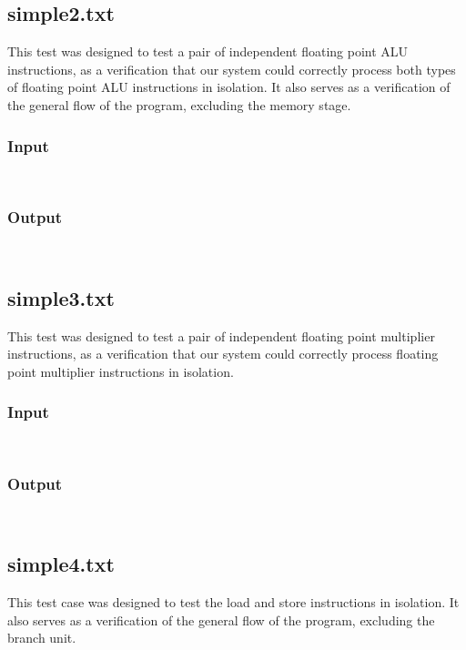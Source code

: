 \documentclass[12pt]{article}
\begin{document}
\subsection{simple2.txt}
This test was designed to test a pair of independent floating point ALU instructions, as a verification that our system could correctly process both types of floating point ALU instructions in isolation.  It also serves as a verification of the general flow of the program, excluding the memory stage.

\subsubsection*{Input}
\begin{verbatim}
    
\end{verbatim}

\subsubsection*{Output}
\begin{verbatim}
    
\end{verbatim}


\subsection{simple3.txt}
This test was designed to test a pair of independent floating point multiplier instructions, as a verification that our system could correctly process floating point multiplier instructions in isolation.

\subsubsection*{Input}
\begin{verbatim}
    
\end{verbatim}

\subsubsection*{Output}
\begin{verbatim}
    
\end{verbatim}

\subsection{simple4.txt}
This test case was designed to test the load and store instructions in isolation.  It also serves as a verification of the general flow of the program, excluding the branch unit.
\end{document}
